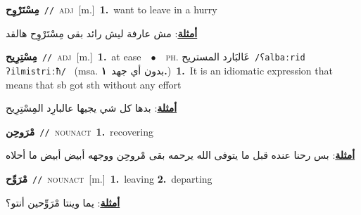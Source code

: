 \documentclass[10pt,a4paper,twoside]{article} %
\begin{document}
\begin{multicols}{2}
{\setlength\topsep{0pt}\textbf{\foreignlanguage{arabic}{مِسْتَرْوِح}}\ {\color{gray}\texttt{//}\color{black}}\ \textsc{adj}\ [m.]\ \textbf{1.}~want to leave in a hurry\  \begin{flushright}\color{gray}\foreignlanguage{arabic}{\textbf{\underline{\foreignlanguage{arabic}{أمثلة}}}: مش عارفة ليش رائد بقى مِسْتَرْوِح هالقد}\end{flushright}\color{black}} \vspace{2mm}

{\setlength\topsep{0pt}\textbf{\foreignlanguage{arabic}{مِسْتِرِيح}}\ {\color{gray}\texttt{//}\color{black}}\ \textsc{adj}\ [m.]\ \textbf{1.}~at ease\ \ $\bullet$\ \ \textsc{ph.} \color{gray} \foreignlanguage{arabic}{عَالبَارد المستريح}\color{black}\ {\color{gray}\texttt{/{\sffamily ʕalbaːrid ʔilmistriːħ}/}\color{black}}\ \color{gray} (msa. \foreignlanguage{arabic}{بدون أي جهد}~\foreignlanguage{arabic}{\textbf{١.}})\color{black}\ \textbf{1.}~It is an idiomatic expression that means that sb got sth without any effort\  \begin{flushright}\color{gray}\foreignlanguage{arabic}{\textbf{\underline{\foreignlanguage{arabic}{أمثلة}}}: بدها كل شي يجيها عالبارِد المِسْتِرِيح}\end{flushright}\color{black}} \vspace{2mm}

{\setlength\topsep{0pt}\textbf{\foreignlanguage{arabic}{مْرَوحِن}}\ {\color{gray}\texttt{//}\color{black}}\ \textsc{noun\textunderscore act}\ \textbf{1.}~recovering\  \begin{flushright}\color{gray}\foreignlanguage{arabic}{\textbf{\underline{\foreignlanguage{arabic}{أمثلة}}}: بس رحنا عنده قبل ما يتوفى الله يرحمه بقى مْروحِن ووجهه أبيض أبيض ما أحلاه}\end{flushright}\color{black}} \vspace{2mm}

{\setlength\topsep{0pt}\textbf{\foreignlanguage{arabic}{مْرَوِّح}}\ {\color{gray}\texttt{//}\color{black}}\ \textsc{noun\textunderscore act}\ [m.]\ \textbf{1.}~leaving  \textbf{2.}~departing\  \begin{flushright}\color{gray}\foreignlanguage{arabic}{\textbf{\underline{\foreignlanguage{arabic}{أمثلة}}}: يما وينتا مْرَوِّحين أنتو؟}\end{flushright}\color{black}} \vspace{2mm}


\end{multicols}
\end{document}
